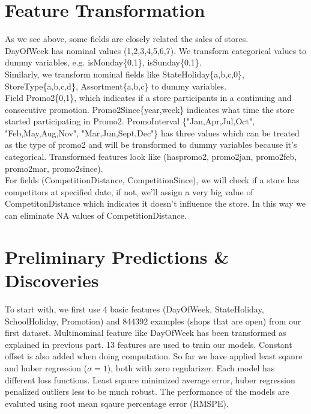 \documentclass[11pt]{article}
\begin{document}
\section{Feature Transformation}
As we see above, some fields are closely related the sales of stores. \\
DayOfWeek has nominal values (1,2,3,4,5,6,7). We transform categorical values to dummy variables, e.g. isMonday\{0,1\}, isSunday\{0,1\}.\\
Similarly, we transform nominal fields like StateHoliday\{a,b,c,0\}, StoreType\{a,b,c,d\}, Assortment\{a,b,c\} to dummy variables.\\
Field Promo2\{0,1\}, which indicates if a store participants in a continuing and consecutive promotion. Promo2Since\{year,week\} indicates what time the store started participating in Promo2. PromoInterval \{"Jan,Apr,Jul,Oct", "Feb,May,Aug,Nov", "Mar,Jun,Sept,Dec"\} has three values which can be treated as the type of promo2 and will be transformed to dummy variables because it's categorical. Transformed features look like (haspromo2, promo2jan, promo2feb, promo2mar, promo2since).\\
For fields (CompetitionDistance, CompetitionSince), we will check if a store has competitors at specified date, if not, we'll assign a very big value of CompetitonDistance which indicates it doesn't influence the store. In this way we can eliminate NA values of CompetitionDistance.

\section{Preliminary Predictions \& Discoveries}
To start with, we first use 4 basic features (DayOfWeek, StateHoliday, SchoolHoliday, Promotion) and 844392 examples (shops that are open) from our first dataset. Multinominal feature like DayOfWeek has been transformed as explained in previous part. 13 features are used to train our models. Constant offset is also added when doing computation. So far we have applied least sqaure and huber regression ($\sigma=1$), both with zero regularizer. Each model has different loss functions. Least sqaure minimized average error, huber regression penalized outliers less to be much robust. The performance of the models are evaluted using root mean sqaure percentage error (RMSPE).
\end{document}
